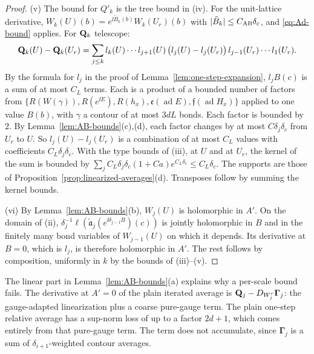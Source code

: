 \begin{proof}
(v) The bound for $Q'_k$ is the tree bound in (iv). For the unit-lattice derivative, $W_k(U)(b)=e^{\ii\tilde B_k(b)}W_k(U_r)(b)$ with $|\tilde B_k|\le C_{\rm AB}\delta_c$, and \eqref{eq:Ad-bound} applies. For $\mathbf Q_k$ telescope:
\[
\mathbf Q_k(U)-\mathbf Q_k(U_r)=\sum_{j\le k}l_k(U)\cdots l_{j+1}(U)\,\big(l_j(U)-l_j(U_r)\big)\,l_{j-1}(U_r)\cdots l_1(U_r).
\]
By the formula for $l_j$ in the proof of Lemma~\ref{lem:one-step-expansion}, $l_jB(c)$ is a sum of at most $C_L$ terms. Each is a product of a bounded number of factors from $\{R(W(\gamma)),R(e^{\ii E}),R(h_x),\mathfrak e(\operatorname{ad}E),\mathfrak f(\operatorname{ad}H_x)\}$ applied to one value $B(b)$, with $\gamma$ a contour of at most $3dL$ bonds. Each factor is bounded by $2$. By Lemma~\ref{lem:AB-bounds}(c),(d), each factor changes by at most $C\delta_j\delta_c$ from $U_r$ to $U$. So $l_j(U)-l_j(U_r)$ is a combination of at most $C_L$ values with coefficients $C_L\delta_j\delta_c$. With the type bounds of (iii), at $U$ and at $U_r$, the kernel of the sum is bounded by $\sum_jC_L\delta_j\delta_c(1+Ca)e^{C_L\delta_c}\le C_L\delta_c$. The supports are those of Proposition~\ref{prop:linearized-averages}(d). Transposes follow by summing the kernel bounds.

(vi) By Lemma~\ref{lem:AB-bounds}(b), $W_j(U)$ is holomorphic in $A'$. On the domain of (ii), $\delta_j^{-1}\ell(\tilde{\mathfrak a}_j(e^{\ii\delta_{j-1}B})(c))$ is jointly holomorphic in $B$ and in the finitely many bond variables of $W_{j-1}(U)$ on which it depends. Its derivative at $B=0$, which is $l_j$, is therefore holomorphic in $A'$. The rest follows by composition, uniformly in $k$ by the bounds of (iii)--(v).
\end{proof}

\begin{remark}\label{rem:AB-outline}
The linear part in Lemma~\ref{lem:AB-bounds}(a) explains why a per-scale bound fails. The derivative at $A'=0$ of the plain iterated average is $\mathbf Q_j-D_{W^r_j}\boldsymbol\Gamma_j$: the gauge-adapted linearization plus a coarse pure-gauge term. The plain one-step relative average has a sup-norm loss of up to a factor $2d+1$, which comes entirely from that pure-gauge term. The term does not accumulate, since $\boldsymbol\Gamma_j$ is a sum of $\delta_{i+1}$-weighted contour averages.
\end{remark}

